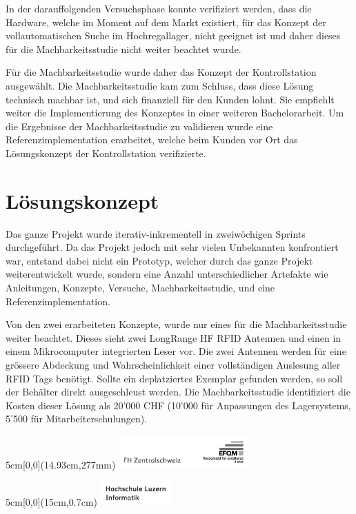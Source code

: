 \documentclass[
	a4paper
]{scrartcl}
\begin{document}
In der darauffolgenden Versuchsphase konnte verifiziert werden, dass die Hardware, welche im Moment auf dem Markt existiert, für das Konzept der vollautomatischen Suche im Hochregallager, nicht geeignet ist und daher dieses für die Machbarkeitsstudie nicht weiter beachtet wurde.

Für die Machbarkeitsstudie wurde daher das Konzept der Kontrollstation ausgewählt. Die Machbarkeitsstudie kam zum Schluss, dass diese Lösung technisch machbar ist, und sich finanziell für den Kunden lohnt. Sie empfiehlt weiter die Implementierung des Konzeptes in einer weiteren Bachelorarbeit. Um die Ergebnisse der Machbarkeitsstudie zu validieren wurde eine Referenzimplementation erarbeitet, welche beim Kunden vor Ort das Lösungskonzept der Kontrollstation verifizierte.

\section{Lösungskonzept}
Das ganze Projekt wurde iterativ-inkrementell in zweiwöchigen Sprints durchgeführt. Da das Projekt jedoch mit sehr vielen Unbekannten konfrontiert war, entstand dabei nicht ein Prototyp, welcher durch das ganze Projekt weiterentwickelt wurde, sondern eine Anzahl unterschiedlicher Artefakte wie Anleitungen, Konzepte, Versuche, Machbarkeitsstudie, und eine Referenzimplementation.

Von den zwei erarbeiteten Konzepte, wurde nur eines für die Machbarkeitsstudie weiter beachtet. Dieses sieht zwei LongRange HF RFID Antennen und einen in einem Mikrocomputer integrierten Leser vor. Die zwei Antennen werden für eine grössere Abdeckung und Wahrscheinlichkeit einer vollständigen Auslesung aller RFID Tags benötigt. Sollte ein deplatziertes Exemplar gefunden werden, so soll der Behälter direkt ausgeschleust werden. Die Machbarkeitsstudie identifiziert die Kosten dieser Lösung als 20'000 CHF (10'000 für Anpassungen des Lagersystems, 5'500 für Mitarbeiterschulungen).

\begin{textblock*}{5cm}[0,0](14.93cm,277mm)
	\includegraphics[keepaspectratio,width=5cm]{img/FHZ_Logo}
\end{textblock*}

\newpage

\begin{textblock*}{5cm}[0,0](15cm,0.7cm)
	\includegraphics[keepaspectratio,width=2.7cm]{img/HSLU_Logo_Header}
\end{textblock*}
\end{document}
